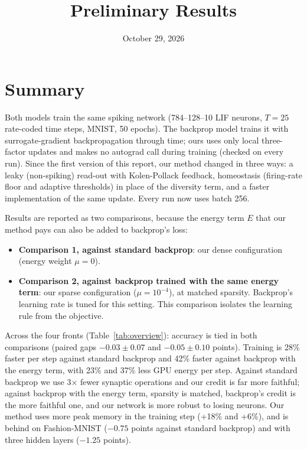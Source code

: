 \documentclass{article}
\title{Preliminary Results}
\author{}
\date{October 29, 2026}
\begin{document}
\maketitle


\section*{Summary}

Both models train the same spiking network (784--128--10 LIF neurons, $T=25$ rate-coded time steps, MNIST, 50
epochs). The backprop model trains it with surrogate-gradient backpropagation through time; ours uses only local
three-factor updates and makes no autograd call during training (checked on every run). Since the first
version of this report, our method changed in three ways: a leaky (non-spiking) read-out with Kolen-Pollack
feedback, homeostasis (firing-rate floor and adaptive thresholds) in place of the diversity term, and a faster
implementation of the same update. Every run now uses batch 256.

Results are reported as two comparisons, because the energy term $E$ that our method pays can also be added to
backprop's loss:
\begin{itemize}
  \item \textbf{Comparison 1, against standard backprop}: our dense configuration (energy weight $\mu = 0$).
  \item \textbf{Comparison 2, against backprop trained with the same energy term}: our sparse configuration
    ($\mu = 10^{-4}$), at matched sparsity. Backprop's learning rate is tuned for this setting. This comparison
    isolates the learning rule from the objective.
\end{itemize}

Across the four fronts (Table~\ref{tab:overview}): accuracy is tied in both comparisons (paired gaps $-0.03 \pm
0.07$ and $-0.05 \pm 0.10$ points). Training is 28\% faster per step against standard backprop and 42\% faster
against backprop with the energy term, with 23\% and 37\% less GPU energy per step. Against standard backprop we
use 3$\times$ fewer synaptic operations and our credit is far more faithful; against backprop with the energy
term, sparsity is matched, backprop's credit is the more faithful one, and our network is more robust to losing
neurons. Our method uses more peak memory in the training step (+18\% and +6\%), and is behind on Fashion-MNIST
($-0.75$ points against standard backprop) and with three hidden layers ($-1.25$ points).
\end{document}
